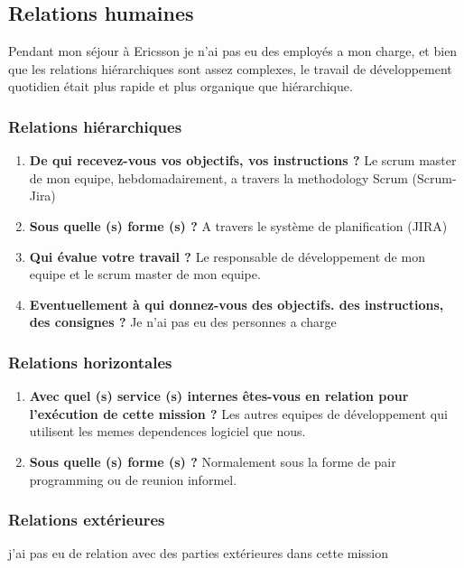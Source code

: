 \documentclass{resume} %
\begin{document}
\subsection{Relations humaines}
	
	
	Pendant mon séjour à Ericsson je n'ai pas eu des employés a mon charge, et bien que les relations hiérarchiques sont assez complexes, le travail de développement quotidien était plus rapide et plus organique que hiérarchique.

	\subsubsection {Relations hiérarchiques}
		\begin{enumerate}
		\item \textbf{De qui recevez-vous vos objectifs, vos instructions ?}
			Le scrum master de mon equipe, hebdomadairement, a travers la methodology Scrum (Scrum-Jira)
		\item \textbf{Sous quelle (s) forme (s) ?}
			A travers le système de planification (JIRA) 
		\item \textbf{Qui évalue votre travail ?}
			Le responsable de développement de mon equipe et le scrum master de mon equipe.
		\item  \textbf{Eventuellement à qui donnez-vous des objectifs. des instructions, des consignes ?}
			Je n'ai pas eu des personnes a charge 
		\end{enumerate}


	\subsubsection {Relations horizontales}	
	\begin{enumerate}
		\item \textbf{ Avec quel (s) service (s) internes êtes-vous en relation pour l'exécution de cette mission ?}
			Les autres equipes de développement qui utilisent les memes dependences logiciel que nous. 
		\item \textbf{Sous quelle (s) forme (s) ?}
			Normalement sous la forme de pair programming ou de reunion informel.
	\end {enumerate}	

	\subsubsection {Relations extérieures}
		j'ai pas eu de relation avec des parties extérieures dans cette mission 
		
\end{document}
